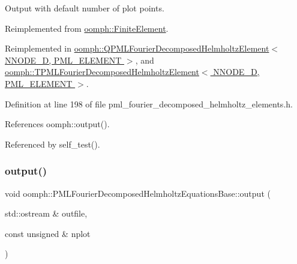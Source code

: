 Output with default number of plot points. 



Reimplemented from \hyperlink{classoomph_1_1FiniteElement_a2ad98a3d2ef4999f1bef62c0ff13f2a7}{oomph\+::\+Finite\+Element}.



Reimplemented in \hyperlink{classoomph_1_1QPMLFourierDecomposedHelmholtzElement_a27085df03fa3b5bc7a0bf02cd18808ed}{oomph\+::\+Q\+P\+M\+L\+Fourier\+Decomposed\+Helmholtz\+Element$<$ N\+N\+O\+D\+E\+\_\+D, P\+M\+L\+\_\+\+E\+L\+E\+M\+E\+N\+T $>$}, and \hyperlink{classoomph_1_1TPMLFourierDecomposedHelmholtzElement_a7740f7614bd05db89ddf4e39668b8a75}{oomph\+::\+T\+P\+M\+L\+Fourier\+Decomposed\+Helmholtz\+Element$<$ N\+N\+O\+D\+E\+\_\+D, P\+M\+L\+\_\+\+E\+L\+E\+M\+E\+N\+T $>$}.



Definition at line 198 of file pml\+\_\+fourier\+\_\+decomposed\+\_\+helmholtz\+\_\+elements.\+h.



References oomph\+::output().



Referenced by self\+\_\+test().

\mbox{\label{classoomph_1_1PMLFourierDecomposedHelmholtzEquationsBase_afb6aca29a5d78e2984c8602d05459cac}} 
\subsubsection{\texorpdfstring{output()}{output()}\hspace{0.1cm}{\footnotesize\ttfamily [2/4]}}
{\footnotesize\ttfamily void oomph\+::\+P\+M\+L\+Fourier\+Decomposed\+Helmholtz\+Equations\+Base\+::output (\begin{DoxyParamCaption}\item[{std\+::ostream \&}]{outfile,  }\item[{const unsigned \&}]{nplot }\end{DoxyParamCaption})\hspace{0.3cm}{\ttfamily [virtual]}}



